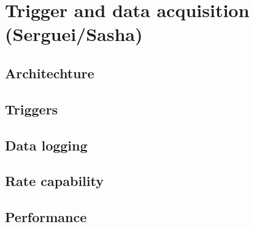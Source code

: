 
\section{Trigger and data acquisition (Serguei/Sasha) \label{sec:trigdaq}}
\subsection{Architechture \label{sec:trigdaqarchichecture}}
\subsection{Triggers \label{sec:trigdaqtriggers}}
\subsection{Data logging \label{sec:trigdaqdata}}
\subsection{Rate capability \label{sec:trigdaqrate}}



\subsection{Performance \label{sec:trigdaqperformance}}

